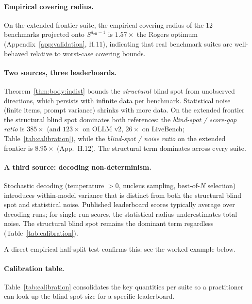 \documentclass{article}
\begin{document}
\paragraph{Empirical covering radius.}
On the extended frontier suite, the empirical covering radius of the
$12$ benchmarks projected onto $S^{d_{\mathrm{eff}}-1}$ is
$1.57\times$ the Rogers optimum (Appendix~\ref{app:validation}, H.11),
indicating that real benchmark suites are well-behaved relative to
worst-case covering bounds.

\paragraph{Two sources, three leaderboards.}
Theorem~\ref{thm:body:indist} bounds the \emph{structural} blind spot
from unobserved directions, which persists with infinite data per
benchmark. Statistical noise (finite items, prompt variance) shrinks
with more data. On the extended frontier the structural blind spot
dominates both references: the \textit{blind-spot / score-gap ratio}
is $385\times$ (and $123\times$ on OLLM v2, $26\times$ on LiveBench;
Table~\ref{tab:calibration}), while the \textit{blind-spot / noise
ratio} on the extended frontier is $8.95\times$ (App.~H.12). The
structural term dominates across every suite.

\paragraph{A third source: decoding non-determinism.}
Stochastic decoding (temperature $> 0$, nucleus sampling, best-of-$N$
selection) introduces within-model variance that is distinct from
both the structural blind spot and statistical noise. Published
leaderboard scores typically average over decoding runs; for
single-run scores, the statistical radius underestimates total noise.
The structural blind spot remains the dominant term regardless
(Table~\ref{tab:calibration}).

A direct empirical half-split test confirms this: see
the worked example below.

\paragraph{Calibration table.}
Table~\ref{tab:calibration} consolidates the key quantities per
suite so a practitioner can look up the blind-spot size for a
specific leaderboard.
\end{document}
